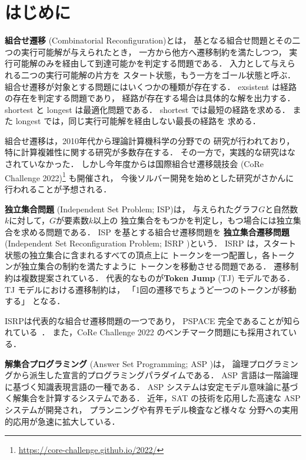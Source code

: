 \section{はじめに}\label{sec:introduction}

\textbf{組合せ遷移} (Combinatorial Reconfiguration)とは，
基となる組合せ問題とその二つの実行可能解が与えられたとき，
一方から他方へ遷移制約を満たしつつ，
実行可能解のみを経由して到達可能かを判定する問題である．
入力として与えられる二つの実行可能解の片方を
スタート状態，もう一方をゴール状態と呼ぶ．
組合せ遷移が対象とする問題にはいくつかの種類が存在する．
exsistent は経路の存在を判定する問題であり，
経路が存在する場合は具体的な解を出力する．
shortest と longest は最適化問題である．
shortest では最短の経路を求める．
また longest では，同じ実行可能解を経由しない最長の経路を
求める．

組合せ遷移は，2010年代から理論計算機科学の分野での
研究が行われており，
特に計算複雑性に関する研究が多数存在する．%
その一方で，実践的な研究はなされていなかった．
しかし今年度からは国際組合せ遷移競技会
(CoRe Challenge 2022)\footnote{\url{https://core-challenge.github.io/2022/}}
も開催され，
今後ソルバー開発を始めとした研究がさかんに行われることが予想される．

\textbf{独立集合問題} (Independent Set Problem; ISP)は，
与えられたグラフ$G$と自然数$k$に対して，$G$が要素数$k$以上の
独立集合をもつかを判定し，もつ場合には独立集合を求める問題である．
ISP を基とする組合せ遷移問題を
\textbf{独立集合遷移問題} (Independent Set Reconfiguration Problem; ISRP
\cite{core:ItoDHPSUU11})という．
ISRP は，スタート状態の独立集合に含まれるすべての頂点上に
トークンを一つ配置し，各トークンが独立集合の制約を満たすように
トークンを移動させる問題である．
遷移制約は複数提案されている．
代表的なものが\textbf{Token Jump} (TJ) モデルである．
TJ モデルにおける遷移制約は，
「1回の遷移でちょうど一つのトークンが移動する」
となる．

ISRPは代表的な組合せ遷移問題の一つであり，
PSPACE 完全であることが知られている~\cite{core:ItoDHPSUU11}．
また，CoRe Challenge 2022 のベンチマーク問題にも採用されている．

\textbf{解集合プログラミング} (Answer Set Programming; ASP
\cite{Gelfond88:iclp})は，
論理プログラミングから派生した宣言的プログラミングパラダイムである．
ASP 言語は一階論理に基づく知識表現言語の一種である．
ASP システムは安定モデル意味論に基づく解集合を計算するシステムである．
近年，SAT の技術を応用した高速な ASP システムが開発され，
プランニングや有界モデル検査など様々な
分野への実用的応用が急速に拡大している．

